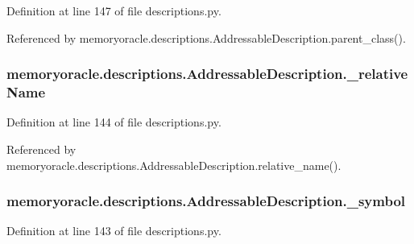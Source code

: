 Definition at line 147 of file descriptions.\+py.



Referenced by memoryoracle.\+descriptions.\+Addressable\+Description.\+parent\+\_\+class().

\hypertarget{classmemoryoracle_1_1descriptions_1_1AddressableDescription_a621a9132072849bbf645372f7262cf5d}{}
\subsubsection[{\+\_\+relative\+Name}]{\setlength{\rightskip}{0pt plus 5cm}memoryoracle.\+descriptions.\+Addressable\+Description.\+\_\+relative\+Name\hspace{0.3cm}{\ttfamily [private]}}\label{classmemoryoracle_1_1descriptions_1_1AddressableDescription_a621a9132072849bbf645372f7262cf5d}


Definition at line 144 of file descriptions.\+py.



Referenced by memoryoracle.\+descriptions.\+Addressable\+Description.\+relative\+\_\+name().

\hypertarget{classmemoryoracle_1_1descriptions_1_1AddressableDescription_a635fff407d54c5be7078ae19ab1a70e5}{}
\subsubsection[{\+\_\+symbol}]{\setlength{\rightskip}{0pt plus 5cm}memoryoracle.\+descriptions.\+Addressable\+Description.\+\_\+symbol\hspace{0.3cm}{\ttfamily [private]}}\label{classmemoryoracle_1_1descriptions_1_1AddressableDescription_a635fff407d54c5be7078ae19ab1a70e5}


Definition at line 143 of file descriptions.\+py.

\hypertarget{classmemoryoracle_1_1descriptions_1_1AddressableDescription_a0c63647032d370f7d04976f4651098df}{}
